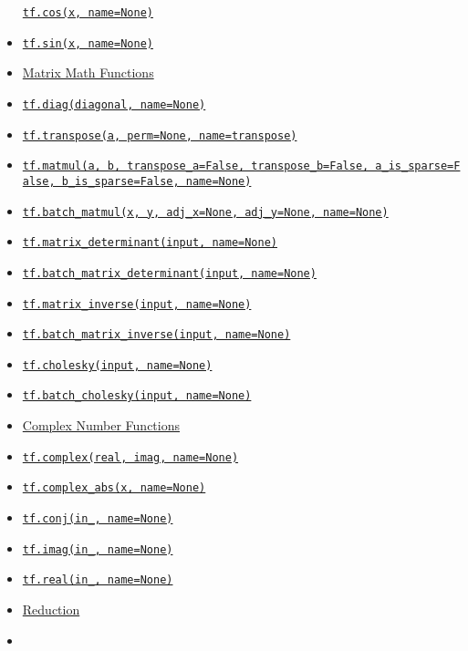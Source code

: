 \begin{itemize}
  \protect\hyperlink{cos}{\texttt{tf.cos(x,\ name=None)}}
\item
  \protect\hyperlink{sin}{\texttt{tf.sin(x,\ name=None)}}
\item
  \protect\hyperlink{AUTOGENERATED-matrix-math-functions}{Matrix Math
  Functions}
\item
  \protect\hyperlink{diag}{\texttt{tf.diag(diagonal,\ name=None)}}
\item
  \protect\hyperlink{transpose}{\texttt{tf.transpose(a,\ perm=None,\ name=\textquotesingle{}transpose\textquotesingle{})}}
\item
  \protect\hyperlink{matmul}{\texttt{tf.matmul(a,\ b,\ transpose\_a=False,\ transpose\_b=False,\ a\_is\_sparse=False,\ b\_is\_sparse=False,\ name=None)}}
\item
  \protect\hyperlink{batchux5fmatmul}{\texttt{tf.batch\_matmul(x,\ y,\ adj\_x=None,\ adj\_y=None,\ name=None)}}
\item
  \protect\hyperlink{matrixux5fdeterminant}{\texttt{tf.matrix\_determinant(input,\ name=None)}}
\item
  \protect\hyperlink{batchux5fmatrixux5fdeterminant}{\texttt{tf.batch\_matrix\_determinant(input,\ name=None)}}
\item
  \protect\hyperlink{matrixux5finverse}{\texttt{tf.matrix\_inverse(input,\ name=None)}}
\item
  \protect\hyperlink{batchux5fmatrixux5finverse}{\texttt{tf.batch\_matrix\_inverse(input,\ name=None)}}
\item
  \protect\hyperlink{cholesky}{\texttt{tf.cholesky(input,\ name=None)}}
\item
  \protect\hyperlink{batchux5fcholesky}{\texttt{tf.batch\_cholesky(input,\ name=None)}}
\item
  \protect\hyperlink{AUTOGENERATED-complex-number-functions}{Complex
  Number Functions}
\item
  \protect\hyperlink{complex}{\texttt{tf.complex(real,\ imag,\ name=None)}}
\item
  \protect\hyperlink{complexux5fabs}{\texttt{tf.complex\_abs(x,\ name=None)}}
\item
  \protect\hyperlink{conj}{\texttt{tf.conj(in\_,\ name=None)}}
\item
  \protect\hyperlink{imag}{\texttt{tf.imag(in\_,\ name=None)}}
\item
  \protect\hyperlink{real}{\texttt{tf.real(in\_,\ name=None)}}
\item
  \protect\hyperlink{AUTOGENERATED-reduction}{Reduction}
\item

\end{itemize}
